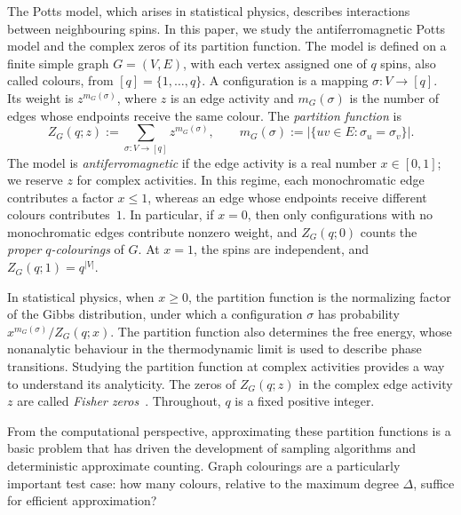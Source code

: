 \documentclass[11pt,reqno]{article}
\theoremstyle{plain}
\theoremstyle{definition}
\theoremstyle{remark}
\theoremstyle{definition}
\theoremstyle{remark}
\newcommand{\Deg}{\Delta}                        %
\newcommand{\Zpart}{Z}                           %
\newcommand{\colours}{[q]}                        %
\begin{document}
The Potts model, which arises in statistical physics, describes
interactions between neighbouring spins.  In this paper, we study the
antiferromagnetic Potts model and the complex zeros of its partition
function.  The model is defined on a finite simple graph \(G=(V,E)\),
with each vertex assigned one of \(q\) spins, also called colours, from
\(\colours=\{1,\ldots,q\}\).  A configuration is a mapping
\(\sigma\colon V\to\colours\).  Its weight is \(z^{m_G(\sigma)}\), where
\(z\) is an edge activity and \(m_G(\sigma)\) is the number of edges
whose endpoints receive the same colour.  The \emph{partition function}
is
\begin{equation}
  \Zpart_G(q;z):=\sum_{\sigma\colon V\to\colours}z^{m_G(\sigma)},
  \qquad
  m_G(\sigma):=\bigl|\{uv\in E:\sigma_u=\sigma_v\}\bigr|.
  \label{eq:intro-potts-Z}
\end{equation}
The model is \emph{antiferromagnetic} if the edge activity is a real
number \(x\in[0,1]\); we reserve \(z\) for complex activities.  In this
regime, each monochromatic edge contributes a factor \(x\le1\), whereas
an edge whose endpoints receive different colours contributes~\(1\).
In particular, if \(x=0\), then only configurations with no
monochromatic edges contribute nonzero weight, and \(\Zpart_G(q;0)\)
counts the \emph{proper \(q\)-colourings} of \(G\).  At \(x=1\), the
spins are independent, and \(\Zpart_G(q;1)=q^{|V|}\).

In statistical physics, when \(x\ge0\), the partition function is the
normalizing factor of the Gibbs distribution, under which a
configuration \(\sigma\) has probability
\(x^{m_G(\sigma)}/\Zpart_G(q;x)\).  The partition function also
determines the free energy, whose nonanalytic behaviour in the
thermodynamic limit is used to describe phase transitions.  Studying the
partition function at complex activities provides a way to understand
its analyticity.  The zeros of \(\Zpart_G(q;z)\) in the complex edge
activity \(z\) are called \emph{Fisher zeros}~\cite{Fisher1965}.
Throughout, \(q\) is a fixed positive integer.

From the computational perspective, approximating these partition
functions is a basic problem that has driven the development of sampling
algorithms and deterministic approximate counting.  Graph colourings are
a particularly important test case: how many colours, relative to the
maximum degree \(\Deg\), suffice for efficient approximation?
\end{document}
